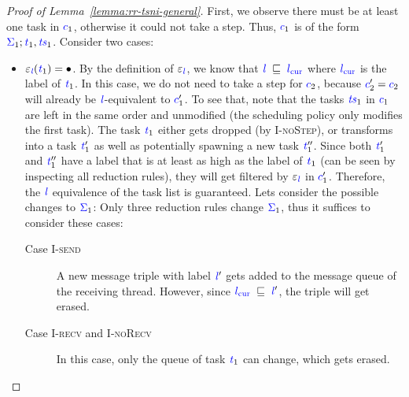 \documentclass{sigplanconf}
\newcommand{\Varid}[1]{\mathit{#1}}
\begin{document}
\begin{proof}[Proof of Lemma~\ref{lemma:rr-tsni-general}]
  First, we observe there must be at least one task in \ensuremath{\ifc{c}_{1}}, otherwise
  it could not take a step.  Thus, \ensuremath{\ifc{c}_{1}} is of the form
  \ensuremath{\ifc{\Sigma}_{1};\ifc{\Varid{t}}_{1},\ifc{\Varid{ts}}_{1}}.  Consider two cases:
  \begin{itemize}
    \item $\ensuremath{\varepsilon_{\ifc{\Varid{l}}}(\ifc{\Varid{t}}_{1})}=\ensuremath{\bullet}$.
    By the definition of \ensuremath{\varepsilon_{\ifc{\Varid{l}}}}, we know that \ensuremath{\ifc{\Varid{l}}\;\flows\;\lcurr}
    where \ensuremath{\lcurr} is the label of \ensuremath{\ifc{\Varid{t}}_{1}}.
    In this case, we do not need to take a step for
    \ensuremath{\ifc{c}_{2}}, because \ensuremath{\ifc{c}_{2}'\mathrel{=}\ifc{c}_{2}} will already be \ensuremath{\ifc{\Varid{l}}}-equivalent to \ensuremath{\ifc{c}_{1}'}.
    To see that, note that the tasks \ensuremath{\ifc{\Varid{ts}}_{1}} in \ensuremath{\ifc{c}_{1}} are left in the
    same order and unmodified (the scheduling policy only
    modifies the first task). The task \ensuremath{\ifc{\Varid{t}}_{1}} either
    gets dropped (by \textsc{I-noStep}), or
    transforms into a task \ensuremath{\ifc{\Varid{t}}_{1}'} as well as potentially spawning a new
    task \ensuremath{\ifc{\Varid{t}}_{1}''}.  Since both \ensuremath{\ifc{\Varid{t}}_{1}'} and \ensuremath{\ifc{\Varid{t}}_{1}''} have a label that is
    at least as high as the label of \ensuremath{\ifc{\Varid{t}}_{1}} (can be seen
    by inspecting all reduction rules), they will get filtered
    by \ensuremath{\varepsilon_{\ifc{\Varid{l}}}} in \ensuremath{\ifc{c}_{1}'}.  Therefore, the \ensuremath{\ifc{\Varid{l}}} equivalence of the
    task list is guaranteed.
    Lets consider the possible changes to \ensuremath{\ifc{\Sigma}_{1}}:
    Only three reduction rules change \ensuremath{\ifc{\Sigma}_{1}},
    thus it suffices to consider these cases:
    \begin{description}
      \item[Case \textsc{I-send}]
      A new message triple with label \ensuremath{\ifc{\Varid{l}}'} gets added to the message
      queue of the receiving thread.  However, since \ensuremath{\lcurr\;\flows\;\ifc{\Varid{l}}'},
      the triple will get erased.
      \item[Case \textsc{I-recv} and \textsc{I-noRecv}]
      In this case, only the queue of
      task \ensuremath{\ifc{\Varid{t}}_{1}} can change, which gets erased.

\end{description}
\end{itemize}
\end{proof}
\end{document}

